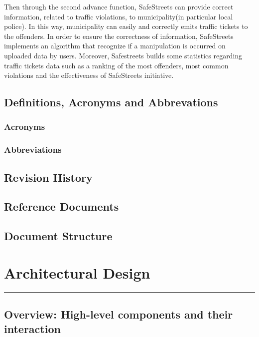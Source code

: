 \documentclass[12pt]{article}
\begin{document}
Then through the second advance function, SafeStreets can provide correct information, related to traffic violations, to municipality(in particular local police). In this way, municipality can easily and correctly emits traffic tickets to the offenders. In order to ensure the correctness of information, SafeStreets implements an algorithm that recognize if a manipulation is occurred on uploaded data by users. Moreover, Safestreets builds some statistics regarding traffic tickets data such as a ranking of the most offenders, most common violations and the effectiveness of SafeStreets initiative.
\vspace{1cm}

\subsection{Definitions, Acronyms and Abbrevations}
\vspace{5mm}
\subsubsection{Acronyms}
\subsubsection{Abbreviations}
\vspace{5mm}
\subsection{Revision History}
\subsection{Reference Documents}
\subsection{Document Structure}

\newpage
\section{Architectural Design}
\hrule
\vspace{1cm}
\subsection{Overview: High-level components and their interaction}
\end{document}
